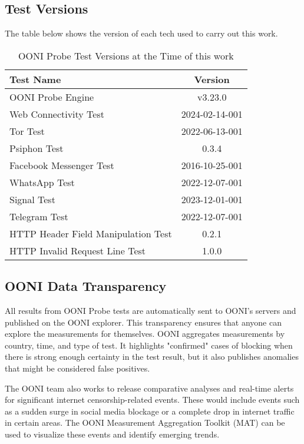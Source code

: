\subsection{Test Versions}

The table below shows the version of each tech used to carry out this work.

\vspace{1.5em}

\begin{table}[H]
\centering
\caption{OONI Probe Test Versions at the Time of this work}
\begin{tabular}{lc}
\toprule
\textbf{Test Name} & \textbf{Version} \\
\midrule
OONI Probe Engine & v3.23.0 \\
Web Connectivity Test    & 2024-02-14-001  \\
Tor Test    & 2022-06-13-001  \\
Psiphon Test    & 0.3.4  \\
Facebook Messenger Test    & 2016-10-25-001  \\
WhatsApp Test    & 2022-12-07-001  \\
Signal Test    & 2023-12-01-001  \\
Telegram Test    & 2022-12-07-001  \\
HTTP Header Field Manipulation Test    & 0.2.1  \\
HTTP Invalid Request Line Test    & 1.0.0  \\
\bottomrule
\end{tabular}
\label{tab:blocked_summary}
\end{table}

\subsection{OONI Data Transparency}

All results from OONI Probe tests are automatically sent to OONI's servers and published on the OONI explorer. This transparency ensures that anyone can explore the measurements for themselves. OONI aggregates measurements by country, time, and type of test. It highlights "confirmed" cases of blocking when there is strong enough certainty in the test result, but it also publishes anomalies that might be considered false positives. 

The OONI team also works to release comparative analyses and real-time alerts for significant internet censorship-related events. These would include events such as a sudden surge in social media blockage or a complete drop in internet traffic in certain areas. The OONI Measurement Aggregation Toolkit (MAT) can be used to visualize these events and identify emerging trends.  

